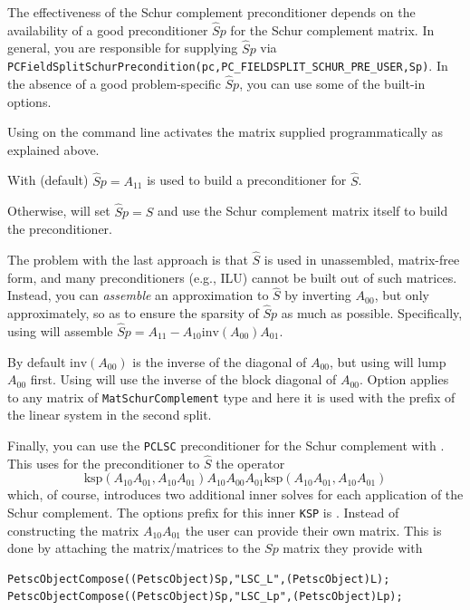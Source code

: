 The effectiveness of the Schur complement preconditioner depends on the availability of a good preconditioner $\hat Sp$ for the Schur complement matrix.
In general, you are responsible for supplying $\hat Sp$ via
\lstinline{PCFieldSplitSchurPrecondition(pc,PC_FIELDSPLIT_SCHUR_PRE_USER,Sp)}.
In the absence of a good
problem-specific $\hat Sp$, you can use some of the built-in options.

Using  on the command line activates
the matrix supplied programmatically as explained above.

With  (default) $\hat Sp = A_{11}$ is used to build a
preconditioner for $\hat S$.

Otherwise,  will set $\hat Sp = \hat S$ and use the Schur complement matrix itself to build the preconditioner.

The problem with the last approach is that $\hat S$ is used in unassembled, matrix-free form, and many preconditioners (e.g., ILU) cannot be built out of
such matrices. Instead, you can \emph{assemble}  an approximation to $\hat S$ by inverting $A_{00}$, but only approximately, so as to ensure the sparsity of $\hat Sp$ as much as possible.
Specifically, using  will assemble $\hat Sp = A_{11} - A_{10} \text{inv}(A_{00}) A_{01}$.

By default $\text{inv}(A_{00})$ is the inverse of the diagonal of $A_{00}$, but using  will
lump $A_{00}$ first. Using  will use the inverse of the block diagonal of $A_{00}$.
Option  applies to any matrix of \lstinline{MatSchurComplement} type and here it is used with the prefix
 of the linear system in the second split.

Finally, you can use the \lstinline{PCLSC} preconditioner for the Schur complement with . This uses for the preconditioner to $\hat{S}$ the operator
\[
  \text{ksp}(A_{10} A_{01},A_{10} A_{01}) A_{10} A_{00} A_{01} \text{ksp}(A_{10} A_{01},A_{10} A_{01})
\]
 which, of course, introduces two additional inner solves for each application of the Schur complement. The options prefix for this inner \lstinline{KSP} is . Instead of constructing the matrix $A_{10} A_{01}$ the user can provide their own matrix. This is done by attaching the matrix/matrices to the $ Sp $ matrix they provide with
\begin{lstlisting}
PetscObjectCompose((PetscObject)Sp,"LSC_L",(PetscObject)L); 
PetscObjectCompose((PetscObject)Sp,"LSC_Lp",(PetscObject)Lp);
\end{lstlisting}


